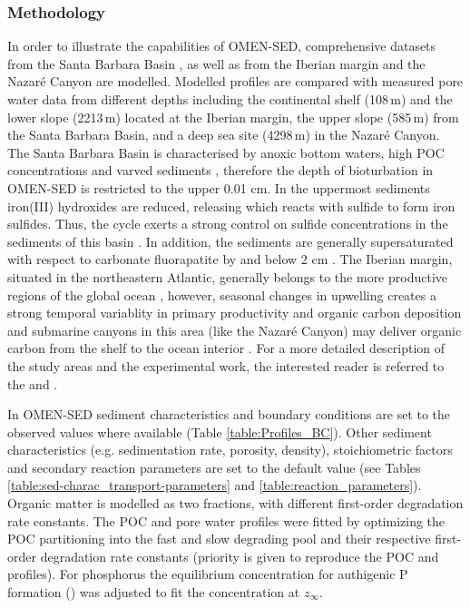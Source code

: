 \documentclass[gmd, manuscript]{copernicus}
\begin{document}
\subsubsection{Methodology}
In order to illustrate the capabilities of OMEN-SED, comprehensive datasets from the Santa Barbara Basin \citep{reimers_porewater_1996}, as well as from the Iberian margin and the Nazar\'e Canyon \citep{epping_oxidation_2002} 
are modelled. Modelled profiles are compared with measured pore water data from different depths including the continental shelf (108\,m) and the lower slope (2213\,m) located at the Iberian margin,
the upper slope (585\,m) from the Santa Barbara Basin, and a deep sea site (4298\,m) in the Nazar\'e Canyon. 
The Santa Barbara Basin is characterised by anoxic bottom waters, high POC concentrations and varved sediments \citep{reimers_seasonal_1990}, therefore the depth of bioturbation in OMEN-SED 
is restricted to the upper 0.01 cm. In the uppermost sediments iron(III) hydroxides are reduced, releasing  which reacts with sulfide to form iron sulfides. 
Thus, the  cycle exerts a strong control on sulfide concentrations in the sediments of this basin \citep{reimers_porewater_1996}. 
In addition, the sediments are generally supersaturated with respect to carbonate fluorapatite by and below 2 cm \citep{reimers_porewater_1996}. 
The Iberian margin, situated in the northeastern Atlantic, generally belongs to the more productive regions of the global ocean \citep{longhurst_estimate_1995}, however, seasonal changes in upwelling creates a strong temporal variablity in 
primary productivity and organic carbon deposition and submarine canyons in this area (like the Nazar\'e Canyon) may deliver organic carbon from the shelf to the ocean interior \citep{van_weering_recent_2002, epping_oxidation_2002}.
For a more detailed description of the study areas and the experimental work, the interested reader is referred to the \citet{reimers_porewater_1996} and \citet{epping_oxidation_2002}. 

In OMEN-SED sediment characteristics and boundary conditions are set to the observed values where available (Table \ref{table:Profiles_BC}). Other sediment characteristics (e.g. sedimentation rate, porosity, density), 
stoichiometric factors and secondary reaction parameters are set to the default value (see Tables \ref{table:sed-charac_transport-parameters} and \ref{table:reaction_parameters}).
Organic matter is modelled as two fractions, with different first-order degradation rate constants. 
The POC and pore water profiles were fitted by optimizing the POC partitioning into the fast and slow degrading pool and their respective first-order degradation rate constants (priority is given to reproduce the POC 
and  profiles). For phosphorus the equilibrium concentration for authigenic P formation () was adjusted to fit the  concentration at $z_\infty$. 
\end{document}
